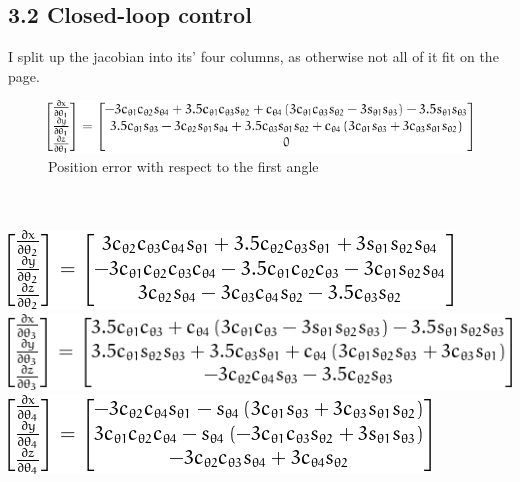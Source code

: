 \subsection{3.2 Closed-loop control}
I split up the jacobian into its' four columns, as otherwise not all of it fit on the page. \\
\begin{figure}
	\includegraphics[]{jac_col1.png}
	\caption{Position error with respect to the first angle}
\end{figure} \\ \\
\includegraphics[]{jac_col2.png} \\
\includegraphics[]{jac_col3.png} \\
\includegraphics[]{jac_col4.png}
